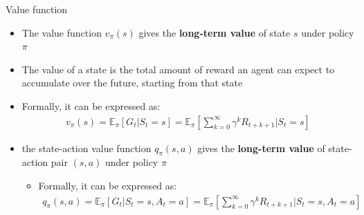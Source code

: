 \documentclass[presentation, 9pt]{beamer}\mode<presentation>{\usetheme{AMSBolognaFC}}
\begin{document}
\begin{frame}{Value function}
\begin{itemize}
	\item The value function $v_{\pi}(s)$ gives the \textbf{long-term value} of state $s$ under policy $\pi$
	\item The value of a state is the total amount of reward an agent can expect to accumulate over the future, starting from that state
	\item Formally, it can be expressed as:
	\begin{equation*}
		\begin{split}
			v_{\pi}(s) = \mathbb{E}_{\pi} [G_t | S_t = s] = \mathbb{E}_{\pi} \left[ \sum_{k=0}^{\infty} \gamma^k R_{t+k+1} | S_t = s \right]	
		\end{split}
	\end{equation*}
	\item the state-action value function $q_{\pi}(s,a)$ gives the \textbf{long-term value} of state-action pair $(s,a)$ under policy $\pi$
	\begin{itemize}
		\item Formally, it can be expressed as:
		\begin{equation*}
			\begin{split}
				q_{\pi}(s,a) = \mathbb{E}_{\pi} [G_t | S_t = s, A_t = a] = \mathbb{E}_{\pi} \left[ \sum_{k=0}^{\infty} \gamma^k R_{t+k+1} | S_t = s, A_t = a \right]
			\end{split}
		\end{equation*}
	\end{itemize}
\end{itemize}
\end{frame}
\section*{}

\frame{\titlepage}

\section*{\refname}

\begin{frame}{\refname}
	\tiny
	\nocite{*}
	\printbibliography
\end{frame}

\end{document}
